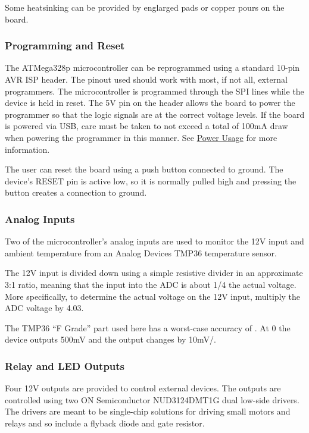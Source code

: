 \documentclass{article}
\newcommand{\textoverline}[1]{$\overline{\mbox{#1}}$}
\begin{document}
Some heatsinking can be provided by englarged pads or copper pours on the board.

\subsubsection{Programming and Reset} \label{sssec:ProgReset}
The ATMega328p microcontroller can be reprogrammed using a standard 10-pin AVR ISP header.  The
pinout used should work with most, if not all, external programmers.  The microcontroller is
programmed through the SPI lines while the device is held in reset.  The 5V pin on the header allows
the board to power the programmer so that the logic signals are at the correct voltage levels.  If
the board is powered via USB, care must be taken to not exceed a total of 100mA draw when powering
the programmer in this manner.  See \hyperref[ssec:PowerUsage]{Power Usage} for more information.

The user can reset the board using a push button connected to ground.  The device's
\textoverline{RESET} pin is active low, so it is normally pulled high and pressing the button
creates a connection to ground.

\subsubsection{Analog Inputs} \label{sssec:AnalogIn}
Two of the microcontroller's analog inputs are used to monitor the 12V input and ambient temperature
from an Analog Devices TMP36 temperature sensor.

The 12V input is divided down using a simple resistive divider in an approximate 3:1 ratio, meaning that the
input into the ADC is about 1/4 the actual voltage.  More specifically, to determine the actual
voltage on the 12V input, multiply the ADC voltage by 4.03.

The TMP36 ``F Grade'' part used here has a worst-case accuracy of \textcelsius{}.  At
0\textcelsius{} the device outputs 500mV and the output changes by 10mV/\textcelsius{}.

\subsubsection{Relay and LED Outputs} \label{sssec:RelayLED} 
Four 12V outputs are provided to control external devices.  The outputs are controlled using two ON
Semiconductor NUD3124DMT1G dual low-side drivers.  The drivers are meant to be single-chip solutions
for driving small motors and relays and so include a flyback diode and gate resistor.
\end{document}

